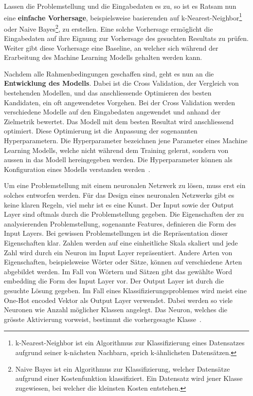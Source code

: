 Lassen die Problemstellung und die Eingabedaten es zu, so ist es Ratsam nun eine \textbf{einfache Vorhersage}, beispielsweise basierenden auf k-Nearest-Neighbor\footnote{k-Nearest-Neighbor ist ein Algorithmus zur Klassifizierung eines Datensatzes aufgrund seiner k-nächsten Nachbarn, sprich k-ähnlichsten Datensätzen.} oder Naive Bayes\footnote{Naive Bayes ist ein Algorithmus zur Klassifizierung, welcher Datensätze aufgrund einer Kostenfunktion klassifiziert. Ein Datensatz wird jener Klasse zugewiesen, bei welcher die kleinsten Kosten entstehen.}, zu erstellen. Eine solche Vorhersage ermöglicht die Eingabedaten auf ihre Eignung zur Vorhersage des gesuchten Resultats zu prüfen. Weiter gibt diese Vorhersage eine Baseline, an welcher sich während der Erarbeitung des Machine Learning Modells gehalten werden kann.~\autocite{DesignMLSecondaryCite}

Nachdem alle Rahmenbedingungen geschaffen sind, geht es nun an die \textbf{Entwicklung des Modells}. Dabei ist die Cross Validation, der Vergleich von bestehenden Modellen, und das anschliessende Optimieren des besten Kandidaten, ein oft angewendetes Vorgehen. Bei der Cross Validation werden verschiedene Modelle auf den Eingabedaten angewendet und anhand der Zielmetrik bewertet. Das Modell mit dem besten Resultat wird anschliessend optimiert. Diese Optimierung ist die Anpassung der sogenannten Hyperparametern. Die Hyperparameter bezeichnen jene Parameter eines Machine Learning Modells, welche nicht während dem Training gelernt, sondern von aussen in das Modell hereingegeben werden. Die Hyperparameter können als Konfiguration eines Modells verstanden werden~\autocite{DesignML}.

Um eine Problemstellung mit einem neuronalen Netzwerk zu lösen, muss erst ein solches entworfen werden. Für das Design eines neuronalen Netzwerks gibt es keine klaren Regeln, viel mehr ist es eine Kunst. Der Input sowie der Output Layer sind oftmals durch die Problemstellung gegeben. Die Eigenschaften der zu analysierenden Problemstellung, sogenannte Features, definieren die Form des Input Layers. Bei gewissen Problemstellungen ist die Repräsentation dieser Eigenschaften klar. Zahlen werden auf eine einheitliche Skala skaliert und jede Zahl wird durch ein Neuron im Input Layer repräsentiert. Andere Arten von Eigenschaften, beispielsweise Wörter oder Sätze, können auf verschiedene Arten abgebildet werden. Im Fall von Wörtern und Sätzen gibt das gewählte Word embedding die Form des Input Layer vor. Der Output Layer ist durch die gesuchte Lösung gegeben. Im Fall eines Klassifizierungsproblemes wird meist eine One-Hot encoded Vektor als Output Layer verwendet. Dabei werden so viele Neuronen wie Anzahl möglicher Klassen angelegt. Das Neuron, welches die grösste Aktivierung vorweist, bestimmt die vorhergesagte Klasse~\autocite{NNDesign}.

